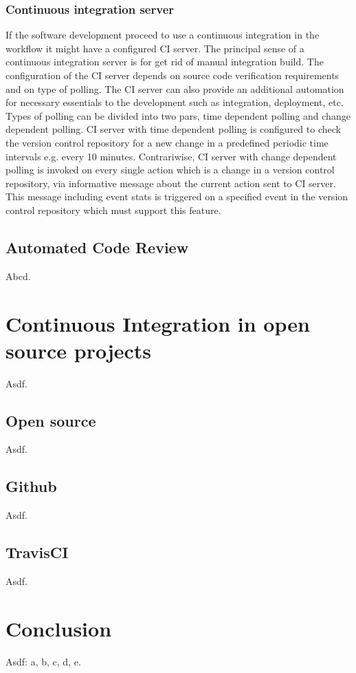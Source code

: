 \subsection{Continuous integration server}

If the software development proceed to use a continuous integration in the workflow it might have a configured CI server. The principal sense of a continuous integration server is for get rid of manual integration build. The configuration of the CI server depends on source code verification requirements and on type of polling. The CI server can also provide an additional automation for necessary essentials to the development such as integration, deployment, etc.\\

Types of polling can be divided into two pars, time dependent polling and change dependent polling. CI server with time dependent polling is configured to check the version control repository for a new change in a predefined periodic time intervals e.g. every 10 minutes. Contrariwise, CI server with change dependent polling is invoked on every single action which is a change in a version control repository, via informative message about the current action sent to CI server. This message including event stats is triggered on a specified event in the version control repository which must support this feature.

\section{Automated Code Review}
Abcd.

\chapter{Continuous Integration in open source projects}
Asdf.

\section{Open source}
Asdf.

\section{Github}
Asdf.

\section{TravisCI}
Asdf.

\chapter{Conclusion}
Asdf: a\cite{MIQBOT}, b\cite{GHMP}, c\cite{CIMF}, d\cite{CITW}, e\cite{CIPD}.
